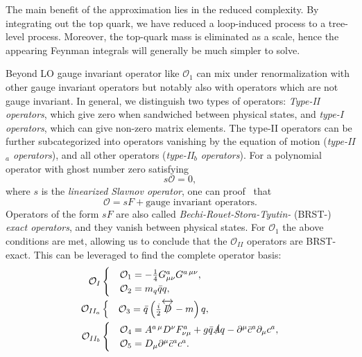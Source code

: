 The main benefit of the approximation lies in the reduced complexity. By integrating out the top quark, we have reduced a loop-induced process to a tree-level process. Moreover, the top-quark mass is eliminated as a scale, hence the appearing Feynman integrals will generally be much simpler to solve.

Beyond \acs{LO} gauge invariant operator like $\mathcal{O}_1$ can mix under renormalization with other gauge invariant operators but notably also with operators which are not gauge invariant. In general, we distinguish two types of operators: \textit{Type-II operators}, which give zero when sandwiched between physical states, and \textit{type-I operators}, which can give non-zero matrix elements. The type-II operators can be further subcategorized into operators vanishing by the equation of motion (\textit{type-II${}_a$ operators}), and all other operators (\textit{type-II${}_b$ operators}). For a polynomial operator with ghost number zero satisfying
\begin{equation}
s \mathcal{O} = 0,
\end{equation}
where $s$ is the \textit{linearized Slavnov operator}, one can proof~\cite{Kluberg-Stern:1974iel, Joglekar:1975nu, Henneaux:2011rma} that
\begin{equation}
\mathcal{O} = s F + \text{gauge invariant operators}.
\end{equation}
Operators of the form $s F$ are also called \textit{Bechi-Rouet-Stora-Tyutin-} (BRST-) \textit{exact operators}, and they vanish between physical states. For $\mathcal{O}_1$ the above conditions are met, allowing us to conclude that the $\mathcal{O}_{II}$ operators are BRST-exact. This can be leveraged to find the complete operator basis:
\begin{equation}
\begin{split}
\mathcal{O}_{I} &\begin{cases} &\mathcal{O}_1 = -\frac{1}{4} G^a_{\mu \nu} G^{a\, \mu\nu}, \\
&\mathcal{O}_2 = m_q \bar{q} q, \end{cases} \\
\mathcal{O}_{II_a} &\begin{cases} &\mathcal{O}_3 = \bar{q} \left( \frac{i}{2} \overleftrightarrow{\slashed{D}} - m \right) q, \end{cases} \\
\mathcal{O}_{II_b} &\begin{cases} &\mathcal{O}_4 = A^{a\, \mu} D^\nu F_{\nu\mu}^a + g \bar{q} \slashed{A} q - \partial^\mu \bar{c}^a \partial_\mu c^a, \\
&\mathcal{O}_5 = D_\mu \partial^\mu \bar{c}^a c^a. \end{cases}
\end{split}
\label{eq:4:operators}
\end{equation}

